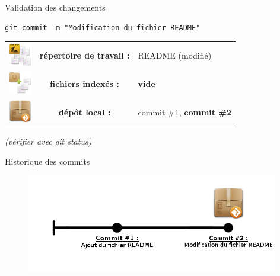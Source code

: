 \documentclass{beamer}
\begin{document}
\begin{frame}[fragile]{Validation des changements}
	\begin{lstlisting}[frame=single]
		git commit -m "Modification du fichier README"
	\end{lstlisting}
	
	\begin{center}
		\begin{tabular}{l c l}
		\includegraphics[width=1cm]{img/working_dir} & \textbf{répertoire de travail :} & README (modifié)\\
		\includegraphics[width=1cm]{img/stash} & \textbf{fichiers indexés :} & \textbf{vide}\\
		\includegraphics[width=1cm]{img/git_repo} & \textbf{dépôt local :} & commit \#1, \textbf{commit \#2}\\
		\end{tabular} 
	\end{center}

	\begin{center}
		\textit{(vérifier avec git status)}
	\end{center}
\end{frame}

\begin{frame}{Historique des commits}

	\begin{figure}
		\centering
		\includegraphics[width=11cm]{img/repo3}
	\end{figure}
\end{frame}
\end{document}
